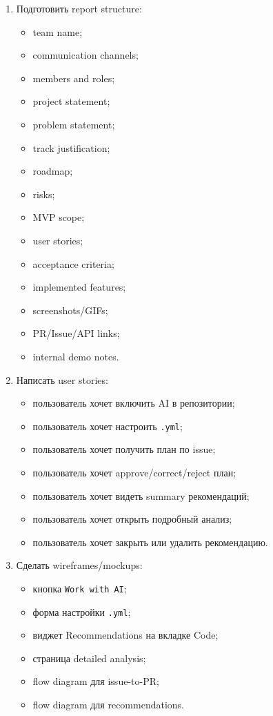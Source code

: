\documentclass[12pt,a4paper]{article}
\begin{document}
\begin{enumerate}
    \item Подготовить report structure:
    \begin{itemize}
        \item team name;
        \item communication channels;
        \item members and roles;
        \item project statement;
        \item problem statement;
        \item track justification;
        \item roadmap;
        \item risks;
        \item MVP scope;
        \item user stories;
        \item acceptance criteria;
        \item implemented features;
        \item screenshots/GIFs;
        \item PR/Issue/API links;
        \item internal demo notes.
    \end{itemize}

    \item Написать user stories:
    \begin{itemize}
        \item пользователь хочет включить AI в репозитории;
        \item пользователь хочет настроить \texttt{.yml};
        \item пользователь хочет получить план по issue;
        \item пользователь хочет approve/correct/reject план;
        \item пользователь хочет видеть summary рекомендаций;
        \item пользователь хочет открыть подробный анализ;
        \item пользователь хочет закрыть или удалить рекомендацию.
    \end{itemize}

    \item Сделать wireframes/mockups:
    \begin{itemize}
        \item кнопка \texttt{Work with AI};
        \item форма настройки \texttt{.yml};
        \item виджет Recommendations на вкладке Code;
        \item страница detailed analysis;
        \item flow diagram для issue-to-PR;
        \item flow diagram для recommendations.
    \end{itemize}


\end{enumerate}
\end{document}
